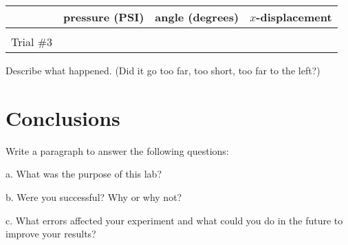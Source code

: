\documentclass[10pt]{exam}
\begin{document}
\noindent
\begin{tabular}{|*4{l|}}
  \hline
  & pressure (PSI) & angle (degrees) & $x$-displacement\\\hline
  &&& \\
  Trial \#3 &&& \\
  \hline
\end{tabular}

\noindent
Describe what happened. (Did it go too far, too short, too far to the left?)
\vspace{5em}

\pagebreak
			
\section*{Conclusions}
Write a paragraph to answer the following questions:

a.	What was the purpose of this lab? 

b.	Were you successful?  Why or why not? 

c.	What errors affected your experiment and what could you do in the future to improve your results?
\end{document}
